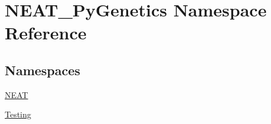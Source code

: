 \hypertarget{namespaceNEAT__PyGenetics}{}\section{N\+E\+A\+T\+\_\+\+Py\+Genetics Namespace Reference}
\label{namespaceNEAT__PyGenetics}
\subsection*{Namespaces}
\begin{DoxyCompactItemize}
\item 
 \hyperlink{namespaceNEAT__PyGenetics_1_1NEAT}{N\+E\+AT}
\item 
 \hyperlink{namespaceNEAT__PyGenetics_1_1Testing}{Testing}
\end{DoxyCompactItemize}
